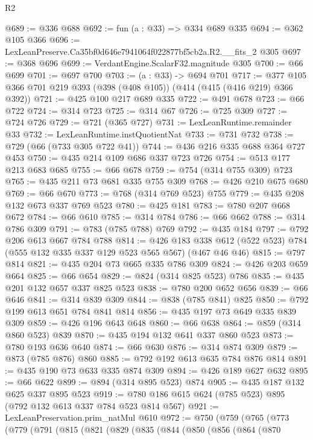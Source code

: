 \begin{lexlean}{R2}
\begin{coremodule}
@689 := @336 @688
@692 := fun (a : @33) => @334 @689 @335
@694 := @362 @105 @366
@696 := LexLeanPreserve.Ca35bf0d646e7941064f022877bf5cb2a.R2.__fits_2 @305
@697 := @368 @696
@699 := VerdantEngine.ScalarF32.magnitude @305
@700 := @66 @699
@701 := @697 @700
@703 := (a : @33) -> @694 @701
@717 := @377 @105 @366 @701 @219 @393 (@398 (@408 @105)) (@414 (@415 (@416 @219) @366 @392))
@721 := @425 @100 @217 @689 @335
@722 := @491 @678
@723 := @66 @722
@724 := @314 @723
@725 := @314 @67
@726 := @725 @309
@727 := @724 @726
@729 := @721 (@365 @727)
@731 := LexLeanRuntime.remainder @33
@732 := LexLeanRuntime.instQuotientNat
@733 := @731 @732
@738 := @729 (@66 (@733 @305 @722 @41))
@744 := @436 @216 @335 @688 @364 @727 @453
@750 := @435 @214 @109 @686 @337 @723 @726
@754 := @513 @177 @213 @683 @685
@755 := @66 @678
@759 := @754 (@314 @755 @309) @723
@765 := @435 @211 @73 @681 @335 @755 @309
@768 := @426 @210 @675 @680
@769 := @66 @670
@773 := @768 (@314 @769 @523) @755
@779 := @435 @208 @132 @673 @337 @769 @523
@780 := @425 @181
@783 := @780 @207 @668 @672
@784 := @66 @610
@785 := @314 @784
@786 := @66 @662
@788 := @314 @786 @309
@791 := @783 (@785 @788) @769
@792 := @435 @184
@797 := @792 @206 @613 @667 @784 @788
@814 := @426
    @183
    @338
    @612
    (@522 @523)
    @784
    (@555 @132 @335 @337 @129 @523 @565 @567)
    (@467 @46 @46)
@815 := @797 @814
@821 := @435 @204 @73 @665 @335 @786 @309
@824 := @426 @203 @659 @664
@825 := @66 @654
@829 := @824 (@314 @825 @523) @786
@835 := @435 @201 @132 @657 @337 @825 @523
@838 := @780 @200 @652 @656
@839 := @66 @646
@841 := @314 @839 @309
@844 := @838 (@785 @841) @825
@850 := @792 @199 @613 @651 @784 @841 @814
@856 := @435 @197 @73 @649 @335 @839 @309
@859 := @426 @196 @643 @648
@860 := @66 @638
@864 := @859 (@314 @860 @523) @839
@870 := @435 @194 @132 @641 @337 @860 @523
@873 := @780 @193 @636 @640
@874 := @66 @630
@876 := @314 @874 @309
@879 := @873 (@785 @876) @860
@885 := @792 @192 @613 @635 @784 @876 @814
@891 := @435 @190 @73 @633 @335 @874 @309
@894 := @426 @189 @627 @632
@895 := @66 @622
@899 := @894 (@314 @895 @523) @874
@905 := @435 @187 @132 @625 @337 @895 @523
@919 := @780 @186 @615 @624 (@785 @523) @895 (@792 @132 @613 @337 @784 @523 @814 @567)
@921 := LexLeanPreservation.prim_natMul @610
@972 := @750
    (@759
      (@765
        (@773
          (@779
            (@791
              (@815
                (@821
                  (@829
                    (@835
                      (@844
                        (@850
                          (@856
                            (@864
                              (@870

\end{coremodule}
\end{lexlean}
